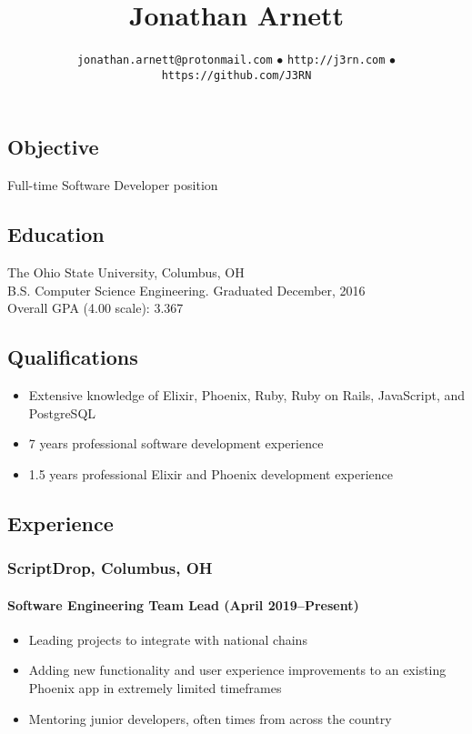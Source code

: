 \documentclass[]{article}
\begin{document}
\title{Jonathan Arnett}
\author{\texttt{jonathan.arnett@protonmail.com} $\bullet$ \texttt{http://j3rn.com} $\bullet$ \texttt{https://github.com/J3RN}}
\date{}
\maketitle

\subsection*{Objective}
Full-time Software Developer position

\subsection*{Education}
The Ohio State University, Columbus, OH \\
B.S. Computer Science Engineering. Graduated December, 2016 \\
Overall GPA (4.00 scale): 3.367

\subsection*{Qualifications}
\begin{itemize}
\item Extensive knowledge of Elixir, Phoenix, Ruby, Ruby on Rails, JavaScript, and PostgreSQL
\item 7 years professional software development experience
\item 1.5 years professional Elixir and Phoenix development experience
\end{itemize}

\subsection*{Experience}

\subsubsection*{ScriptDrop, Columbus, OH}
\paragraph{Software Engineering Team Lead (April 2019--Present)}
\begin{itemize}
\item Leading projects to integrate with national chains
\item Adding new functionality and user experience improvements to an existing Phoenix app in extremely limited timeframes
\item Mentoring junior developers, often times from across the country
\end{itemize}
\end{document}
